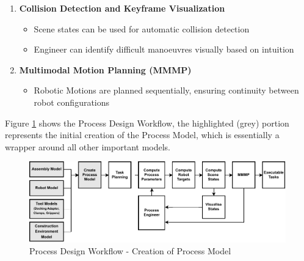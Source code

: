 \begin{enumerate}
	\item \textbf{Collision Detection and Keyframe Visualization}
	\begin{itemize}
		\item Scene states can be used for automatic collision detection
		\item Engineer can identify difficult manoeuvres visually based on intuition 
	\end{itemize}

    \item \textbf{Multimodal Motion Planning (MMMP)}
	\begin{itemize}
		\item Robotic Motions are planned sequentially, ensuring continuity between robot configurations 
	\end{itemize}
\end{enumerate}

Figure \ref{fig:process-design-1} shows the Process Design Workflow, the highlighted (grey) portion represents the initial creation of the Process Model, which is essentially a wrapper around all other important models. 

\begin{figure}[!h]
    \centering
    \includegraphics[width=0.99\textwidth]{images/6a/process_1.pdf}
    \caption{Process Design Workflow - Creation of Process Model}
    \label{fig:process-design-1}
\end{figure}

